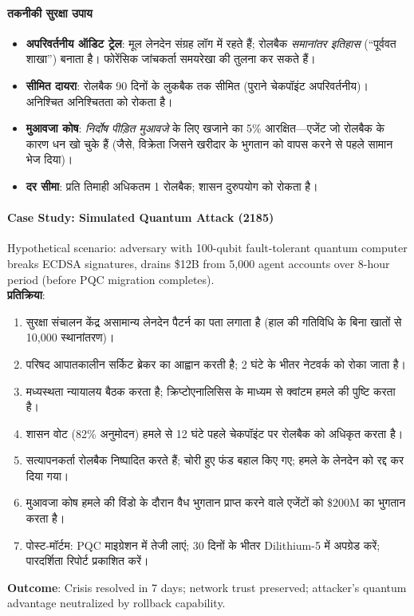 \documentclass[11pt]{article}
\begin{document}
\begin{itemize}[noitemsep]
\begin{itemize}[noitemsep]
\paragraph{तकनीकी सुरक्षा उपाय}
\begin{itemize}[noitemsep]
  \item \textbf{अपरिवर्तनीय ऑडिट ट्रेल}: मूल लेनदेन संग्रह लॉग में रहते हैं; रोलबैक \emph{समानांतर इतिहास} (``पूर्ववत शाखा'') बनाता है। फोरेंसिक जांचकर्ता समयरेखा की तुलना कर सकते हैं।
  \item \textbf{सीमित दायरा}: रोलबैक 90 दिनों के लुकबैक तक सीमित (पुराने चेकपॉइंट अपरिवर्तनीय)। अनिश्चित अनिश्चितता को रोकता है।
  \item \textbf{मुआवजा कोष}: \emph{निर्दोष पीड़ित मुआवजे} के लिए खजाने का 5\% आरक्षित—एजेंट जो रोलबैक के कारण धन खो चुके हैं (जैसे, विक्रेता जिसने खरीदार के भुगतान को वापस करने से पहले सामान भेज दिया)।
  \item \textbf{दर सीमा}: प्रति तिमाही अधिकतम 1 रोलबैक; शासन दुरुपयोग को रोकता है।
\end{itemize}

\paragraph{Case Study: Simulated Quantum Attack (2185)}
Hypothetical scenario: adversary with 100-qubit fault-tolerant quantum computer breaks ECDSA signatures, drains \$12B from 5,000 agent accounts over 8-hour period (before PQC migration completes).\\
\textbf{प्रतिक्रिया}:
\begin{enumerate}[noitemsep]
  \item सुरक्षा संचालन केंद्र असामान्य लेनदेन पैटर्न का पता लगाता है (हाल की गतिविधि के बिना खातों से 10,000 स्थानांतरण)।
  \item परिषद आपातकालीन सर्किट ब्रेकर का आह्वान करती है; 2 घंटे के भीतर नेटवर्क को रोका जाता है।
  \item मध्यस्थता न्यायालय बैठक करता है; क्रिप्टोएनालिसिस के माध्यम से क्वांटम हमले की पुष्टि करता है।
  \item शासन वोट (82\% अनुमोदन) हमले से 12 घंटे पहले चेकपॉइंट पर रोलबैक को अधिकृत करता है।
  \item सत्यापनकर्ता रोलबैक निष्पादित करते हैं; चोरी हुए फंड बहाल किए गए; हमले के लेनदेन को रद्द कर दिया गया।
  \item मुआवजा कोष हमले की विंडो के दौरान वैध भुगतान प्राप्त करने वाले एजेंटों को \$200M का भुगतान करता है।
  \item पोस्ट-मॉर्टम: PQC माइग्रेशन में तेजी लाएं; 30 दिनों के भीतर Dilithium-5 में अपग्रेड करें; पारदर्शिता रिपोर्ट प्रकाशित करें।
\end{enumerate}
\textbf{Outcome}: Crisis resolved in 7 days; network trust preserved; attacker's quantum advantage neutralized by rollback capability.


\end{itemize}
\end{itemize}
\end{document}
